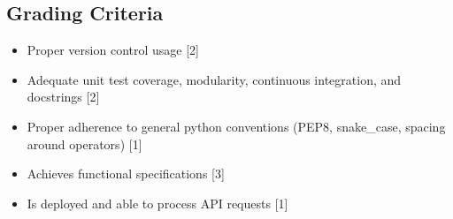 \subsection*{Grading Criteria}
\begin{itemize}
	\item Proper version control usage [2]
	\item Adequate unit test coverage, modularity, continuous integration, and docstrings [2]
	\item Proper adherence to general python conventions (PEP8, snake\_case, spacing around operators) [1]
	\item Achieves functional specifications [3]
	\item Is deployed and able to process API requests [1]

\end{itemize}





